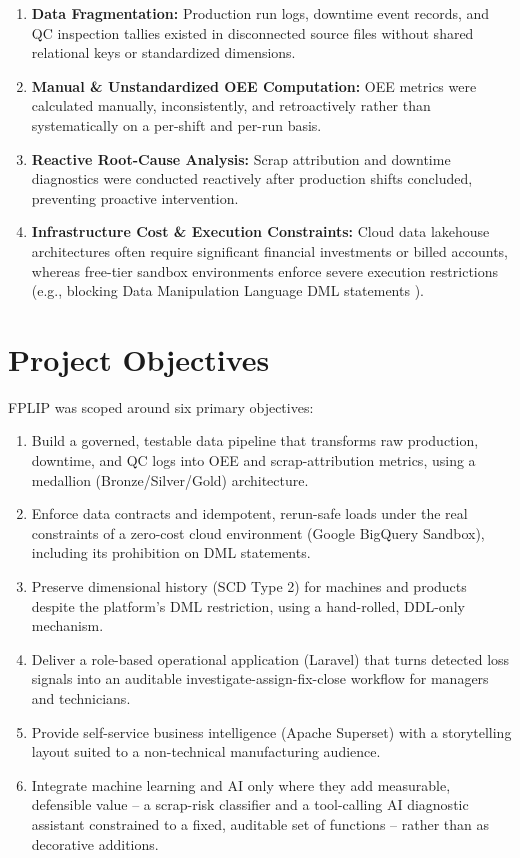 \documentclass[12pt, a4paper]{report}
\begin{document}
\begin{enumerate}
    \item \textbf{Data Fragmentation:} Production run logs, downtime event records, and QC inspection tallies existed in disconnected source files without shared relational keys or standardized dimensions.
    \item \textbf{Manual \& Unstandardized OEE Computation:} OEE metrics were calculated manually, inconsistently, and retroactively rather than systematically on a per-shift and per-run basis.
    \item \textbf{Reactive Root-Cause Analysis:} Scrap attribution and downtime diagnostics were conducted reactively after production shifts concluded, preventing proactive intervention.
    \item \textbf{Infrastructure Cost \& Execution Constraints:} Cloud data lakehouse architectures often require significant financial investments or billed accounts, whereas free-tier sandbox environments enforce severe execution restrictions (e.g., blocking Data Manipulation Language DML statements \cite{google_bq_dml_pricing}).
\end{enumerate}

\section{Project Objectives}
FPLIP was scoped around six primary objectives:
\begin{enumerate}
    \item Build a governed, testable data pipeline that transforms raw production, downtime, and QC logs into OEE and scrap-attribution metrics, using a medallion (Bronze/Silver/Gold) architecture.
    \item Enforce data contracts and idempotent, rerun-safe loads under the real constraints of a zero-cost cloud environment (Google BigQuery Sandbox), including its prohibition on DML statements.
    \item Preserve dimensional history (SCD Type 2) for machines and products despite the platform's DML restriction, using a hand-rolled, DDL-only mechanism.
    \item Deliver a role-based operational application (Laravel) that turns detected loss signals into an auditable investigate-assign-fix-close workflow for managers and technicians.
    \item Provide self-service business intelligence (Apache Superset) with a storytelling layout suited to a non-technical manufacturing audience.
    \item Integrate machine learning and AI only where they add measurable, defensible value -- a scrap-risk classifier and a tool-calling AI diagnostic assistant constrained to a fixed, auditable set of functions -- rather than as decorative additions.
\end{enumerate}
\end{document}
